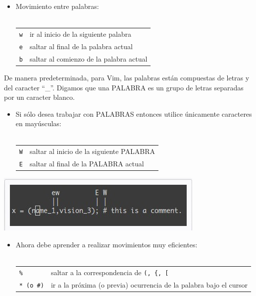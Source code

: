 \documentclass[12pt]{article}
\begin{document}
\begin{itemize}
	\item Movimiento entre palabras: \\ \\
\begin{tabular}{ l l }
	\texttt{w} & ir al inicio de la siguiente palabra \\
	\texttt{e} & saltar al final de la palabra actual \\
	\texttt{b} & saltar al comienzo de la palabra actual \\
\end{tabular}
\end{itemize}



	De manera predeterminada, para Vim, las palabras están compuestas de letras y del caracter ``\_''. 
Digamos que una PALABRA es un grupo de letras separadas por un caracter blanco. 

\begin{itemize}
	\item Si sólo desea trabajar con PALABRAS entonces utilice únicamente caracteres en mayúsculas: \\ \\
\begin{tabular}{ l l }
	\texttt{W} & saltar al inicio de la siguiente PALABRA \\
	\texttt{E} & saltar al final de la PALABRA actual \\
\end{tabular}
\end{itemize}

\begin{center}
 \includegraphics{./img/wordWORD.jpg}
\end{center}

	
\begin{itemize}
	\item Ahora debe aprender a realizar movimientos muy eficientes: \\ \\
\begin{tabular}{ l l }
	\texttt{\%} & saltar a la correspondencia de \texttt{(, \{, [ }  \\
        \texttt{* (o \#)} & ir a la próxima (o previa) ocurrencia de la palabra bajo el cursor \\
\end{tabular}
\end{itemize}
\end{document}
